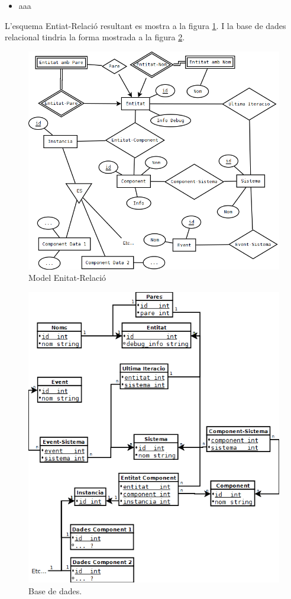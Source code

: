 \begin{itemize}
  \item aaa
\end{itemize}

L'esquema Entiat-Relació resultant es mostra a la figura \ref{fig:EntitatRelacio}. I la base de dades relacional tindria la forma mostrada a la figura \ref{fig:BBDDRelacional}.

\begin{figure}
  \includegraphics[width=1\linewidth]{./img/EntitatRelacio.png}
  \caption{Model Enitat-Relació \label{fig:EntitatRelacio}}
\end{figure}

\begin{figure}
  \includegraphics[width=1\linewidth]{./img/BBDDRelacional.png}
  \caption{Base de dades. \label{fig:BBDDRelacional}}
\end{figure}